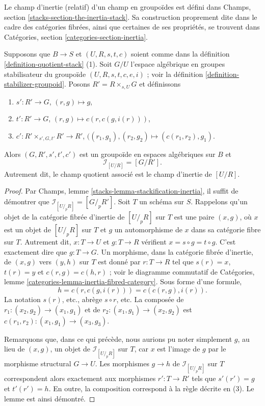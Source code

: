 \noindent
Le champ d'inertie (relatif) d'un champ en groupoïdes est défini dans Champs,
section \ref{stacks-section-the-inertia-stack}. Sa construction proprement
dite dans le cadre des catégories fibrées, ainsi que certaines de ses
propriétés, se trouvent dans Catégories, section
\ref{categories-section-inertia}.

\begin{lemma}
\label{lemma-presentation-inertia}
Supposons que $B \to S$ et $(U, R, s, t, c)$ soient comme dans la
définition \ref{definition-quotient-stack} (1). Soit $G/U$ l'espace
algébrique en groupes stabilisateur du groupoïde
$(U, R, s, t, c, e, i)$ ; voir la définition
\ref{definition-stabilizer-groupoid}. Posons $R' = R \times_{s, U} G$ et
définissons
\begin{enumerate}
\item $s' : R' \to G$, $(r, g) \mapsto g$,
\item $t' : R' \to G$, $(r, g) \mapsto c(r, c(g, i(r)))$,
\item $c' : R' \times_{s', G, t'} R' \to R'$, $((r_1, g_1), (r_2, g_2) \mapsto (c(r_1, r_2), g_1)$.
\end{enumerate}
Alors $(G, R', s', t', c')$ est un groupoïde en espaces algébriques sur
$B$ et
$$
\mathcal{I}_{[U/R]} = [G/ R'].
$$
Autrement dit, le champ quotient associé est le champ d'inertie de $[U/R]$.
\end{lemma}

\begin{proof}
Par Champs, lemme \ref{stacks-lemma-stackification-inertia}, il suffit de
démontrer que $\mathcal{I}_{[U/_{\!p}R]} = [G/_{\!p} R']$. Soit $T$ un
schéma sur $S$. Rappelons qu'un objet de la catégorie fibrée d'inertie de
$[U/_{\!p}R]$ sur $T$ est une paire $(x, g)$, où $x$ est un objet de
$[U/_{\!\!p}R]$ sur $T$ et $g$ un automorphisme de $x$ dans sa catégorie
fibre sur $T$. Autrement dit, $x : T \to U$ et $g : T \to R$ vérifient
$x = s \circ g = t \circ g$. C'est exactement dire que $g : T \to G$.
Un morphisme, dans la catégorie fibrée d'inertie, de $(x, g)$ vers $(y, h)$
sur $T$ est donné par $r : T \to R$ tel que $s(r) = x$, $t(r) = y$ et
$c(r, g) = c(h, r)$ ; voir le diagramme commutatif de Catégories, lemme
\ref{categories-lemma-inertia-fibred-category}. Sous forme d'une formule,
$$
h = c(r, c(g, i(r))) = c(c(r, g), i(r)).
$$
La notation $s(r)$, etc., abrège $s \circ r$, etc. La composée de
$r_1 : (x_2, g_2) \to (x_1, g_1)$ et de
$r_2 : (x_1, g_1) \to (x_2, g_2)$ est
$c(r_1, r_2) : (x_1, g_1) \to (x_3, g_3)$.

\medskip\noindent
Remarquons que, dans ce qui précède, nous aurions pu noter simplement $g$,
au lieu de $(x, g)$, un objet de $\mathcal{I}_{[U/_{\!p}R]}$ sur $T$, car
$x$ est l'image de $g$ par le morphisme structural $G \to U$. Les morphismes
$g \to h$ de $\mathcal{I}_{[U/_{\!p}R]}$ sur $T$ correspondent alors
exactement aux morphismes $r' : T \to R'$ tels que $s'(r') = g$ et
$t'(r') = h$. En outre, la composition correspond à la règle décrite en
(3). Le lemme est ainsi démontré.
\end{proof}

